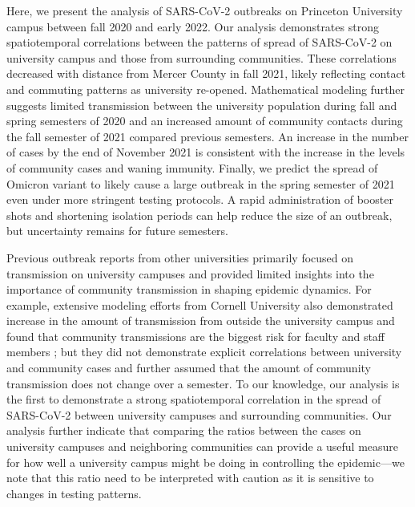 \documentclass[12pt]{article}
\begin{document}
Here, we present the analysis of SARS-CoV-2 outbreaks on Princeton University campus between fall 2020 and early 2022.
Our analysis demonstrates strong spatiotemporal correlations between the patterns of spread of SARS-CoV-2 on university campus and those from surrounding communities.
These correlations decreased with distance from Mercer County in fall 2021, likely reflecting contact and commuting patterns as university re-opened.
Mathematical modeling further suggests limited transmission between the university population during fall and spring semesters of 2020 and an increased amount of community contacts during the fall semester of 2021 compared previous semesters.
An increase in the number of cases by the end of November 2021 is consistent with the increase in the levels of community cases and waning immunity.
Finally, we predict the spread of Omicron variant to likely cause a large outbreak in the spring semester of 2021 even under more stringent testing protocols.
A rapid administration of booster shots and shortening isolation periods can help reduce the size of an outbreak, but uncertainty remains for future semesters.

Previous outbreak reports from other universities primarily focused on transmission on university campuses \citep{wilson2020multiple,currie2021interventions} and provided limited insights into the importance of community transmission in shaping epidemic dynamics.
For example, extensive modeling efforts from Cornell University also demonstrated increase in the amount of transmission from outside the university campus and found that community transmissions are the biggest risk for faculty and staff members \citep{frazier2022modeling};
but they did not demonstrate explicit correlations between university and community cases and further assumed that the amount of community transmission does not change over a semester.
To our knowledge, our analysis is the first to demonstrate a strong spatiotemporal correlation in the spread of SARS-CoV-2 between university campuses and surrounding communities.
Our analysis further indicate that comparing the ratios between the cases on university campuses and neighboring communities can provide a useful measure for how well a university campus might be doing in controlling the epidemic---we note that this ratio need to be interpreted with caution as it is sensitive to changes in testing patterns.
\end{document}
